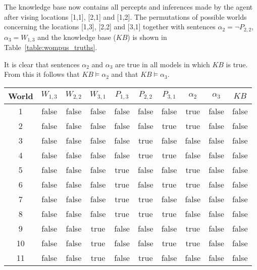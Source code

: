 \begin{enumerate}
The knowledge base now contains all percepts and inferences made by the agent after vising locations [1,1], [2,1] and [1,2]. The permutations of possible worlds concerning the locations [1,3], [2,2] and [3,1] together with sentences $\alpha_2 = \neg P_{2,2}$, $\alpha_3 = W_{1,3}$ and the knowledge base ($KB$) is shown in Table~\ref{table:wompus_truths}. 

It is clear that sentences $\alpha_2$ and $\alpha_3$ are true in all models in which $KB$ is true. From this it follows that $KB \vDash \alpha_2$ and that $KB \vDash \alpha_3$.

\newcommand{\F}{{\color{WildStrawberry}\small false}}
\newcommand{\T}{{\color{YellowGreen}\small true}}

\begin{longtable}[c]{c|cccccc|cc|c}
World & $W_{1,3}$ & $W_{2,2}$ & $W_{3,1}$ & $P_{1,3}$ & $P_{2,2}$ & $P_{3,1}$ & $\alpha_2$ & $\alpha_3$ & $KB$ \\ 
\hline
\endhead
1	  & \F        & \F        & \F        & \F        & \F        & \F        & \T         & \F         & \F   \\
2	  & \F        & \F        & \F        & \F        & \F        & \T        & \T         & \F         & \F   \\
3	  & \F        & \F        & \F        & \F        & \T        & \F        & \F         & \F         & \F   \\
4	  & \F        & \F        & \F        & \F        & \T        & \T        & \F         & \F         & \F   \\
5	  & \F        & \F        & \F        & \T        & \F        & \F        & \T         & \F         & \F   \\
6	  & \F        & \F        & \F        & \T        & \F        & \T        & \T         & \F         & \F   \\
7	  & \F        & \F        & \F        & \T        & \T        & \F        & \F         & \F         & \F   \\
8	  & \F        & \F        & \F        & \T        & \T        & \T        & \F         & \F         & \F   \\
9	  & \F        & \F        & \T        & \F        & \F        & \F        & \T         & \F         & \F   \\
10	  & \F        & \F        & \T        & \F        & \F        & \T        & \T         & \F         & \F   \\
11	  & \F        & \F        & \T        & \F        & \T        & \F        & \F         & \F         & \F   \\

\end{longtable}
\end{enumerate}
